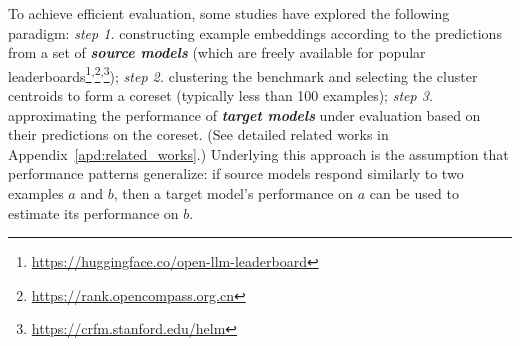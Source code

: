 To achieve efficient evaluation, some studies \citep{AP,tiny} have explored the following paradigm: \textit{step 1.} constructing example embeddings according to the predictions from a set of \textbf{\textit{source models}} (which are freely available for popular leaderboards\footnote{\url{https://huggingface.co/open-llm-leaderboard}}\textsuperscript{,}\footnote{\url{https://rank.opencompass.org.cn}}\textsuperscript{,}\footnote{\url{https://crfm.stanford.edu/helm}}); \textit{step 2.} clustering the benchmark and selecting the cluster centroids to form a coreset (typically less than 100 examples); \textit{step 3.} approximating the performance of \textbf{\textit{target models}} under evaluation based on their predictions on the coreset. (See detailed related works in Appendix~\ref{apd:related_works}.) Underlying this approach is the assumption that performance patterns generalize: if source models respond similarly to two examples $a$ and $b$, then a target model’s performance on $a$ can be used to estimate its performance on $b$.
